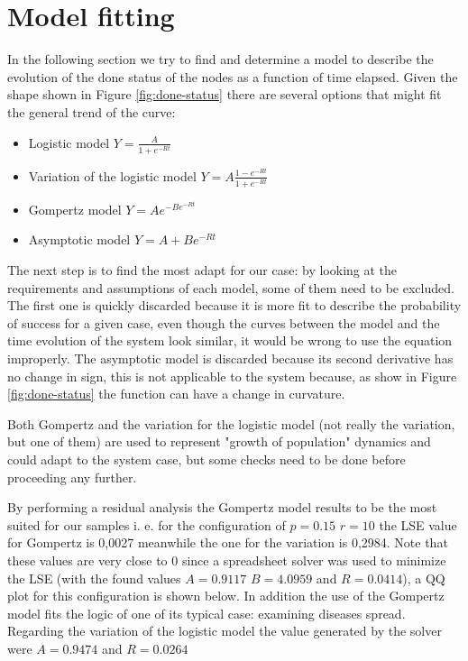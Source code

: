 \section{Model fitting} \label{sec:ModelFitting}
In the following section we try to find and determine a model to describe the evolution of the done status of the nodes as a function of time elapsed. Given the shape shown in Figure \ref{fig:done-status} there are several options that might fit the general trend of the curve:

\begin{itemize}
	\item Logistic model $ Y = \frac{A}{1 + e^{-Rt}} $
	\item Variation of the logistic model $ Y = A\frac{1-e^{-Rt}}{1+e^{-Rt}}$
	\item Gompertz model $ Y = Ae^{-Be^{-Rt}} $
	
	\item Asymptotic model $ Y = A + Be^{-Rt}$
\end{itemize} 

The next step is to find the most adapt for our case: by looking at the requirements and assumptions of each model, some of them need to be excluded. The first one is quickly discarded because it is more fit to describe the probability of success for a given case, even though the curves between the model and the time evolution of the system look similar, it would be wrong to use the equation improperly.
The asymptotic model is discarded because its second derivative has no change in sign, this is not applicable to the system because, as show in Figure \ref{fig:done-status} the function can have a change in curvature.


Both Gompertz and the variation for the logistic model (not really the variation, but one of them) are used to represent "growth of population" dynamics and could adapt to the system case, but some checks need to be done before proceeding any further.

By performing a residual analysis the Gompertz model results to be the most suited for our samples i. e. for the configuration of $p=0.15$  $r=10$ the LSE value for Gompertz is 0,0027 meanwhile the one for the variation is 0,2984. Note that these values are very close to 0 since a spreadsheet solver was used to minimize the LSE (with the found values $A=0.9117$ $B=4.0959$ and $R=0.0414$), a QQ plot for this configuration is shown below. In addition the use of the Gompertz model fits the logic of one of its typical case: examining diseases spread. Regarding the variation of the logistic model the value generated by the solver were $A=0.9474$ and $R=0.0264$


